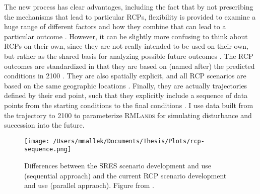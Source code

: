 The new process has clear advantages, including the fact that by not prescribing the mechanisms that lead to particular RCPs, flexibility is provided to examine a huge range of different factors and how they combine that can lead to a particular outcome \citep{VanVuuren2011}. However, it can be slightly more confusing to think about RCPs on their own, since they are not really intended to be used on their own, but rather as the shared basis for analyzing possible future outcomes \citep{VanVuuren2011}. The RCP outcomes are standardized in that they are based on (named after) the predicted conditions in 2100 \citep{VanVuuren2011a}. They are also spatially explicit, and all RCP scenarios are based on the same geographic locations \citep{VanVuuren2011a}. Finally, they are actually trajectories defined by their end point, such that they explicitly include a sequence of data points from the starting conditions to the final conditions \citep{VanVuuren2011}. I use data built from the trajectory to 2100 to parameterize \textsc{RMLands} for simulating disturbance and succession into the future.

\begin{figure}[!htbp]
\texttt{[image: /Users/mmallek/Documents/Thesis/Plots/rcp-sequence.png]}
\caption{Differences between the SRES scenario development and use (sequential approach) and the current RCP scenario development and use (parallel appraoch). Figure from \citet{Moss2008}.}
\label{fig:scenarioapproach}
\end{figure}

